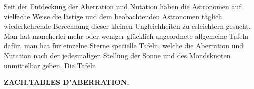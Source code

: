 Seit der Entdeckung der Aberration und Nutation haben die Astronomen auf vielfache Weise die lästige und dem beobachtenden Astronomen täglich wiederkehrende Berechnung dieser kleinen Ungleichheiten zu erleichtern gesucht. Man hat mancherlei mehr oder weniger glücklich angeordnete allgemeine Tafeln dafür, man hat für einzelne Sterne specielle Tafeln, welche die Aberration und Nutation nach der jedesmaligen Stellung der Sonne und des Mondsknoten unmittelbar geben. Die Tafeln\par
\clearpage
\endgroup
\begingroup
\pagestyle{empty}
\newcommand{\GaussVIGathering}[2]{%
  \fancypagestyle{gaussVIGathering}{%
    \fancyhf{}%
    \renewcommand{\headrulewidth}{0pt}%
    \renewcommand{\footrulewidth}{0pt}%
    \fancyfoot[C]{\makebox[\textwidth][l]{%
      \hspace*{.025\textwidth}{\footnotesize\bfseries #1}\hfill
      {\normalsize\bfseries\textls[90]{#2}}\hspace*{.18\textwidth}}}%
  }%
  \thispagestyle{gaussVIGathering}%
}
\thispagestyle{empty}
\noindent{}%
\makebox[12mm][l]{}%
\parbox[t]{\dimexpr\linewidth-24mm\relax}{\centering\footnotesize\bfseries ZACH.\enspace TABLES D'ABERRATION.\par}%
\par\medskip
